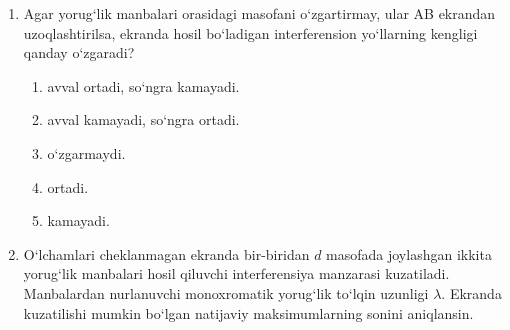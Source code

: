 \begin{enumerate}

\begin{enumerate}[label=\Alph*)]
\item $4\cdot10^{-6}$.
\item $4\cdot10^{-10}$.
\item $8\cdot10^{-6}$.
\item $8\cdot10^{-10}$.
\item $8\cdot10^{-4}$.
\end{enumerate}

\item Agar yorug‘lik manbalari orasidagi masofani o‘zgartirmay, ular AB ekrandan uzoqlashtirilsa, ekranda hosil bo‘ladigan interferension yo‘llarning kengligi qanday o‘zgaradi?
\begin{enumerate}[label=\Alph*)]
\item avval ortadi, so‘ngra kamayadi.
\item avval kamayadi, so‘ngra ortadi.
\item o‘zgarmaydi.
\item ortadi.
\item kamayadi.
\end{enumerate}

\item O‘lchamlari cheklanmagan ekranda bir-biridan $d$ masofada joylashgan ikkita yorug‘lik manbalari hosil qiluvchi interferensiya manzarasi kuzatiladi. Manbalardan nurlanuvchi monoxromatik yorug‘lik to‘lqin uzunligi $\lambda$. Ekranda kuzatilishi mumkin bo‘lgan natijaviy maksimumlarning sonini aniqlansin.


\end{enumerate}
